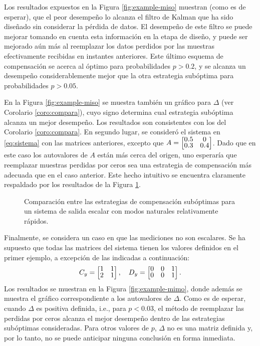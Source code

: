 Los resultados expuestos en la Figura \ref{fig:example-miso} muestran (como es de esperar), que el peor desempe\~no lo alcanza el filtro de Kalman que ha sido dise\~nado sin considerar la p\'erdida de datos. El desempe\~no de este filtro se puede mejorar tomando en cuenta esta informaci\'on en la etapa de dise\~no, y puede ser mejorado a\'un m\'as al reemplazar los datos perdidos por las muestras efectivamente recibidas en instantes anteriores. Este \'ultimo esquema de compensaci\'on se acerca al \'optimo para probabilidades $p>0.2$, y se alcanza un desempe\~no considerablemente mejor que la otra estrategia sub\'optima para probabilidades $p>0.05$.

En la Figura \ref{fig:example-miso} se muestra tambi\'en un gr\'afico para $\Delta$ (ver Corolario \ref{coro:compara}), cuyo signo determina cual estrategia sub\'optima alcanza un mejor desempe\~no. Los resultados son consistentes con los del Corolario \ref{coro:compara}.
\newpage
En segundo lugar, se consider\'o el sistema en \eqref{eq:sistema} con las matrices anteriores, excepto que $\renewcommand{\arraystretch}{0.75} A = \matriz{ 0.5 & 0 \\ 0.3 & 0.4 }$.  Dado que en este caso los autovalores de $A$ est\'an m\'as cerca del origen, uno esperar\'ia que reemplazar muestras perdidas por ceros sea una estrategia de compensaci\'on m\'as adecuada que en el caso anterior. Este hecho intuitivo se encuentra claramente respaldado por los resultados de la Figura \ref{fig:example-delta}.

\begin{figure}[htbp]
\centering
{}
\caption{Comparaci\'on entre las estrategias de compensaci\'on sub\'optimas para un sistema de salida escalar con modos naturales relativamente r\'apidos.}\label{fig:example-delta}
\end{figure}
\newpage
Finalmente, se considera un caso en que las mediciones no son escalares. Se ha supuesto que todas las matrices del sistema tienen los valores definidos en el primer ejemplo, a excepci\'on de las indicadas a continuaci\'on:
\begin{align*}
C_y = \matriz{ 1 & 1 \\ 2 & 1 }, \quad D_y = \matriz{ 0 & 0 & 1 \\ 0 & 0 & 1}.
\end{align*}
Los resultados se muestran en la Figura \ref{fig:example-mimo}, donde adem\'as se muestra el gr\'afico correspondiente a los autovalores de $\Delta$. Como es de esperar, cuando $\Delta$ es positiva definida, i.e., para $p<0.03$, el m\'etodo de reemplazar las perdidas por ceros alcanza el mejor desempe\~no dentro de las estrategias sub\'optimas consideradas. Para otros valores de $p$, $\Delta$ no es una matriz definida y, por lo tanto, no se puede anticipar ninguna conclusi\'on en forma inmediata.

